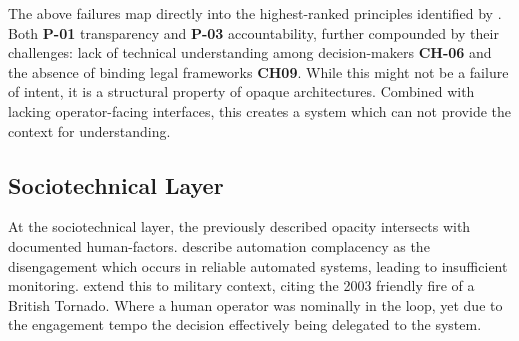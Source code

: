 The above failures map directly into the highest-ranked principles identified by \citet{khan2021ethicsaisystematicliterature}. Both \textbf{P-01} transparency and \textbf{P-03} accountability, further compounded by their challenges: lack of technical understanding among decision-makers \textbf{CH-06} and the absence of binding legal frameworks \textbf{CH09}. While this might not be a failure of intent, it is a structural property of opaque architectures. Combined with lacking operator-facing interfaces, this creates a system which can not provide the context for understanding.



\subsection{Sociotechnical Layer}
At the sociotechnical layer, the previously described opacity intersects with documented human-factors. \citet{parasuraman2010complacency} describe automation complacency as the disengagement which occurs in reliable automated systems, leading to insufficient monitoring. \citet{aimag.v40i1.2848} extend this to military context, citing the 2003 friendly fire of a British Tornado. Where a human operator was nominally in the loop, yet due to the engagement tempo the decision effectively being delegated to the system.

